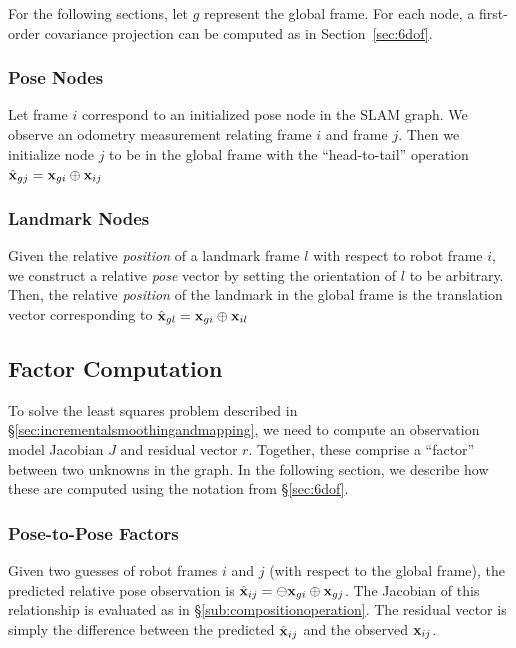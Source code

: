 \documentclass[conference]{IEEEtran}
\begin{document}
For the following sections, let $g$ represent the global frame.  For each node, a
first-order covariance projection can be computed as in Section~\ref{sec:6dof}.

\subsubsection{Pose Nodes}
\label{subs:posenodeinit}

Let frame $i$ correspond to an initialized pose node in the \ac{SLAM} graph.  We observe an
odometry measurement relating frame $i$ and frame $j$.  Then we initialize node $j$ to be
in the global frame with the ``head-to-tail'' operation $ {\hat {\bf x}_{gj}} = {\bf
  x}_{gi} \oplus {\bf x}_{ij} $

\subsubsection{Landmark Nodes}
\label{subs:pointnodeinit}
Given the relative {\it position} of a landmark frame $l$ with respect to robot frame $i$,
we construct a relative {\it pose} vector by setting the orientation of $l$ to be
arbitrary.  Then, the relative {\it position} of the landmark in the global frame is the
translation vector corresponding to $ {\hat {\bf x}}_{gl} = {\bf x}_{gi} \oplus {\bf
 x}_{il} $

\subsection{Factor Computation}
\label{sub:nodeinitializationandedgeresiduals}

To solve the least squares problem described in
\S\ref{sec:incrementalsmoothingandmapping}, we need to compute an observation model
Jacobian $J$ and residual vector $r$.  Together, these comprise a ``factor'' between two
unknowns in the graph.  In the following section, we describe how these are computed using
the notation from \S\ref{sec:6dof}.

\subsubsection{Pose-to-Pose Factors}
\label{subs:posenodelinear}
Given two guesses of robot frames $i$ and $j$ (with respect to the global frame), the
predicted relative pose observation is $ {\hat {\bf x}_{ij}} = \ominus {\bf x}_{gi} \oplus
{\bf x}_{gj}$. The Jacobian of this relationship is evaluated as in
\S\ref{sub:compositionoperation}.  The residual vector is simply the difference
between the predicted ${\hat {\bf x}_{ij}}$ and the observed ${\bf x}_{ij}$.
\end{document}
